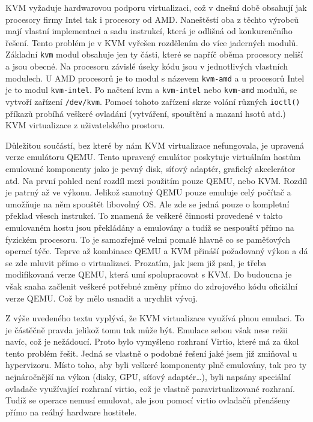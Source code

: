 KVM vyžaduje hardwarovou podporu virtualizaci, což v dnešní době obsahují jak procesory firmy Intel tak i procesory od AMD. Naneštěstí oba z těchto výrobců mají vlastní implementaci a sadu instrukcí, která je odlišná od konkurenčního řešení. Tento problém je v KVM vyřešen rozdělením do více jaderných modulů. Základní \texttt{kvm} modul obsahuje jen ty části, které se napříč oběma procesory neliší a jsou obecné. Na procesoru závislé úseky kódu jsou v jednotlivých vlastních modulech. U AMD procesorů je to modul s názevem \texttt{kvm-amd} a u procesorů Intel je to modul \texttt{kvm-intel}. Po načtení kvm a \texttt{kvm-intel} nebo \texttt{kvm-amd} modulů, se vytvoří zařízení \texttt{/dev/kvm}.
Pomocí tohoto zařízení skrze volání různých \texttt{ioctl()} příkazů  probíhá veškeré ovladání (vytváření, spouštění a mazaní hsotů atd.) KVM virtualizace z uživatelského prostoru.

Důležitou součástí, bez které by nám KVM virtualizace nefungovala, je upravená verze emulátoru QEMU. Tento upravený emulátor poskytuje virtuálním hostům emulované komponenty jako je pevný disk, síťový adaptér, grafický akcelerátor atd. Na první pohled není rozdíl mezi použitím pouze QEMU, nebo KVM. Rozdíl je patrný až ve výkonu. Jelikož samotný QEMU pouze emuluje celý počítač a umožňuje na něm spouštět libovolný OS. Ale zde se jedná pouze o kompletní překlad všesch instrukcí. To znamená že veškeré činnosti provedené v takto emulovaném hostu jsou překládány a emulovány a tudíž se nespouští přímo na fyzickém procesoru. To je samozřejmě velmi pomalé hlavně co se paměťových operací týče. Teprve až kombinace QEMU a KVM přináší požadovaný výkon a dá se zde mluvit přímo o virtualizaci. Prozatím, jak jsem již psal, je třeba modifikovaná verze QEMU, která umí spolupracovat s KVM. Do budoucna je však snaha začlenit veškeré potřebné změny přímo do zdrojového kódu oficiální verze QEMU. Což by mělo usnadit a urychlit vývoj.

Z výše uvedeného textu vyplývá, že KVM virtualizace využívá plnou emulaci. To je částěčně pravda jelikož tomu tak může být. Emulace sebou však nese režii navíc, což je nežádoucí. Proto bylo vymyšleno rozhraní Virtio, které má za úkol tento problém řešit. Jedná se vlastně o podobné řešení jaké jsem již zmiňoval u \xen hypervizoru. Místo toho, aby byli veškeré komponenty plně emulovány, tak pro ty nejnáročnější na výkon (disky, GPU, síťový adaptér\dots), byli napsány speciální ovladače využívající rozhraní virtio, což je vlastně paravirtualizované rozhraní. Tudíž se operace nemusí emulovat, ale jsou pomocí virtio ovladačů přenášeny přímo na reálný hardware hostitele.

